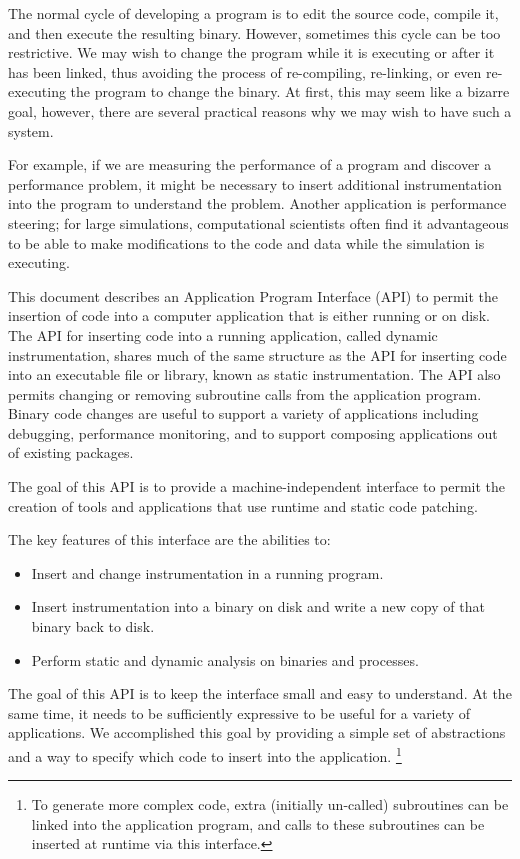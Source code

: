 The normal cycle of developing a program is to edit the source code, compile it,
and then execute the resulting binary. However, sometimes this cycle can be too
restrictive. We may wish to change the program while it is executing or after it
has been linked, thus avoiding the process of re-compiling, re-linking, or even
re-executing the program to change the binary. At first, this may seem like a
bizarre goal, however, there are several practical reasons why we may wish to have
such a system.

For example, if we are measuring the performance of a program and discover a
performance problem, it might be necessary to insert additional instrumentation
into the program to understand the problem. Another application is performance
steering; for large simulations, computational scientists often find it
advantageous to be able to make modifications to the code and data while the
simulation is executing.

This document describes an Application Program Interface (API) to permit the
insertion of code into a computer application that is either running or on disk.
The API for inserting code into a running application, called dynamic
instrumentation, shares much of the same structure as the API for inserting code
into an executable file or library, known as static instrumentation. The API
also permits changing or removing subroutine calls from the application program.
Binary code changes are useful to support a variety of applications including
debugging, performance monitoring, and to support composing applications out of
existing packages.

The goal of this API is to provide a machine-independent interface to permit the
creation of tools and applications that use runtime and static code patching.

The key features of this interface are the abilities to:

\begin{itemize}
  \item Insert and change instrumentation in a running program.

  \item Insert instrumentation into a binary on disk and write a new
    copy of that binary back to disk.

  \item Perform static and dynamic analysis on binaries and processes.
\end{itemize}

The goal of this API is to keep the interface small and easy to understand. At
the same time, it needs to be sufficiently expressive to be useful for a variety
of applications. We accomplished this goal by providing a simple set of
abstractions and a way to specify which code to insert into the
application. \footnote{
  To generate more complex code, extra (initially un-called) subroutines can be
  linked into the application program, and calls to these subroutines can be
  inserted at runtime via this interface.
}
